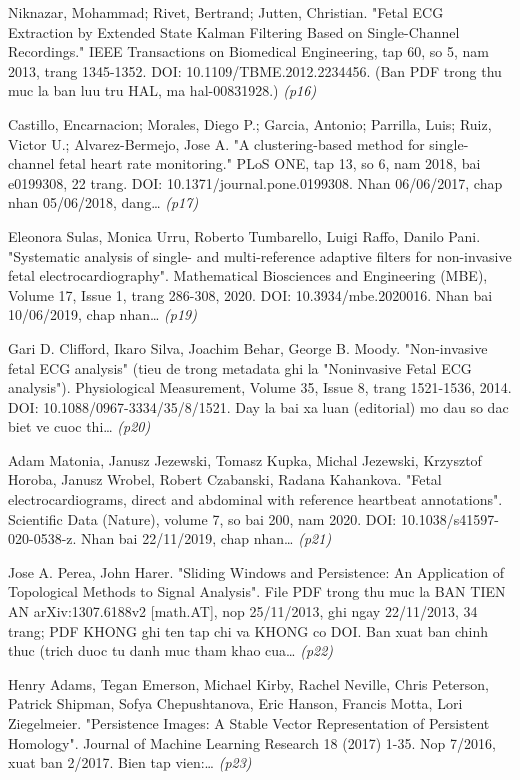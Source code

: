 \begin{enumerate}[leftmargin=1.6em,itemsep=2pt,label={[\arabic*]}]
\item {\small Niknazar, Mohammad; Rivet, Bertrand; Jutten, Christian. "Fetal ECG Extraction by Extended State Kalman Filtering Based on Single-Channel Recordings." IEEE Transactions on Biomedical Engineering, tap 60, so 5, nam 2013, trang 1345-1352. DOI: 10.1109/TBME.2012.2234456. (Ban PDF trong thu muc la ban luu tru HAL, ma hal-00831928.)} \hfill{\scriptsize\itshape (p16)}
\item {\small Castillo, Encarnacion; Morales, Diego P.; Garcia, Antonio; Parrilla, Luis; Ruiz, Victor U.; Alvarez-Bermejo, Jose A. "A clustering-based method for single-channel fetal heart rate monitoring." PLoS ONE, tap 13, so 6, nam 2018, bai e0199308, 22 trang. DOI: 10.1371/journal.pone.0199308. Nhan 06/06/2017, chap nhan 05/06/2018, dang…} \hfill{\scriptsize\itshape (p17)}
\item {\small Eleonora Sulas, Monica Urru, Roberto Tumbarello, Luigi Raffo, Danilo Pani. "Systematic analysis of single- and multi-reference adaptive filters for non-invasive fetal electrocardiography". Mathematical Biosciences and Engineering (MBE), Volume 17, Issue 1, trang 286-308, 2020. DOI: 10.3934/mbe.2020016. Nhan bai 10/06/2019, chap nhan…} \hfill{\scriptsize\itshape (p19)}
\item {\small Gari D. Clifford, Ikaro Silva, Joachim Behar, George B. Moody. "Non-invasive fetal ECG analysis" (tieu de trong metadata ghi la "Noninvasive Fetal ECG analysis"). Physiological Measurement, Volume 35, Issue 8, trang 1521-1536, 2014. DOI: 10.1088/0967-3334/35/8/1521. Day la bai xa luan (editorial) mo dau so dac biet ve cuoc thi…} \hfill{\scriptsize\itshape (p20)}
\item {\small Adam Matonia, Janusz Jezewski, Tomasz Kupka, Michal Jezewski, Krzysztof Horoba, Janusz Wrobel, Robert Czabanski, Radana Kahankova. "Fetal electrocardiograms, direct and abdominal with reference heartbeat annotations". Scientific Data (Nature), volume 7, so bai 200, nam 2020. DOI: 10.1038/s41597-020-0538-z. Nhan bai 22/11/2019, chap nhan…} \hfill{\scriptsize\itshape (p21)}
\item {\small Jose A. Perea, John Harer. "Sliding Windows and Persistence: An Application of Topological Methods to Signal Analysis". File PDF trong thu muc la BAN TIEN AN arXiv:1307.6188v2 [math.AT], nop 25/11/2013, ghi ngay 22/11/2013, 34 trang; PDF KHONG ghi ten tap chi va KHONG co DOI. Ban xuat ban chinh thuc (trich duoc tu danh muc tham khao cua…} \hfill{\scriptsize\itshape (p22)}
\item {\small Henry Adams, Tegan Emerson, Michael Kirby, Rachel Neville, Chris Peterson, Patrick Shipman, Sofya Chepushtanova, Eric Hanson, Francis Motta, Lori Ziegelmeier. "Persistence Images: A Stable Vector Representation of Persistent Homology". Journal of Machine Learning Research 18 (2017) 1-35. Nop 7/2016, xuat ban 2/2017. Bien tap vien:…} \hfill{\scriptsize\itshape (p23)}

\end{enumerate}
